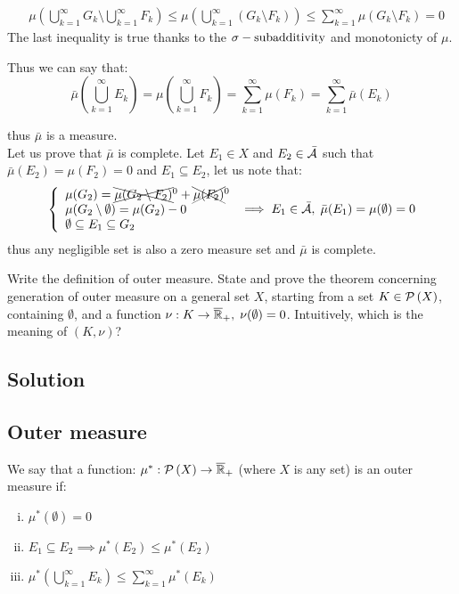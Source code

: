 \begin{itemize}
\begin{enumerate}[i)]
\begin{itemize}
\begin{align*}
                                   & \mu\left(\bigcup_{k=1}^{\infty} G_k \setminus \bigcup_{k=1}^{\infty} F_k \right) \leq \mu\left(\bigcup_{k=1}^{\infty} (G_k \setminus F_k )\right) \leq \sum_{k=1}^{\infty} \mu(G_k\setminus F_k) = 0
                              \end{align*}
                              The last inequality is true thanks to the $\sigma-\text{subadditivity}$ and monotonicty of $\mu$.
                    \end{itemize}
                    Thus we can say that:
                    \[
                        \bar{\mu}\left( \bigcup_{k=1}^{\infty} E_k \right) = \mu \left( \bigcup_{k=1}^{\infty} F_k \right) = \sum_{k=1}^{\infty} \mu(F_k) = \sum_{k=1}^{\infty} \bar{\mu}(E_k)
                    \]
          \end{enumerate}
          thus $\bar{\mu}$ is a measure.\\
          Let us prove that $\bar{\mu}$ is complete.
          Let $E_1 \in X$ and $E_2 \in \bar{\mathcal{A}}$ such that $\bar{\mu}(E_2)=\mu(F_2)=0$ and $E_1 \subseteq E_2$, let us note that:
          \[
              \left\{ \begin{array}{l}
                  \mu(G_2) = \xcancel{\mu(G_2\setminus F_2)}^0+\xcancel{\mu(F_2)}^0 \\
                  \mu(G_2 \setminus \emptyset) = \mu(G_2) - 0                       \\
                  \emptyset \subseteq E_1 \subseteq G_2
              \end{array} \right. \implies E_1\in \bar{\mathcal{A}}, \; \bar{\mu}(E_1)=\mu(\emptyset) = 0
          \]
          thus any negligible set is also a zero measure set and $\bar{\mu}$ is complete.
\end{itemize}


\question
Write the definition of outer measure. State and prove the theorem concerning generation of
outer measure on a general set $X$, starting from a set $K \in\mathcal{P}\left(X\right)$, containing $\emptyset$, and a function
$\nu : K \to \overline{\mathbb{R}}_{+}, \; \nu(\emptyset) = 0$. Intuitively, which is the meaning of $(K, \nu)$?

\subsection*{Solution}

\subsection{Outer measure}\label{outer:def}
We say that a function: $\mu^*:\mathcal{P}\left(X\right)\to\overline{\mathbb{R}}_{+}$ (where $X$ is any set) is an outer measure if:
\begin{enumerate}[i)]
    \item $\mu^*(\emptyset)=0$
    \item \label{outer:mono}$E_1\subseteq E_2 \implies \mu^*(E_2) \leq \mu^*(E_2)$
    \item \label{outer:sub}$\mu^*\left( \bigcup_{k=1}^{\infty} E_k \right) \leq \sum_{k=1}^{\infty} \mu^*(E_k)$
\end{enumerate}

